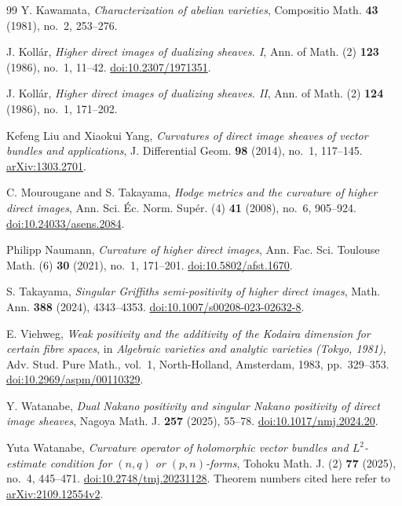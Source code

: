\documentclass[11pt,reqno]{amsart}
\numberwithin{equation}{section}
\theoremstyle{definition}
\theoremstyle{remark}
\begin{document}
\begin{thebibliography}{99}
Y. Kawamata, \emph{Characterization of abelian varieties}, Compositio Math. \textbf{43} (1981), no.~2, 253--276.

J. Koll\'ar, \emph{Higher direct images of dualizing sheaves. I}, Ann. of Math. (2) \textbf{123} (1986), no.~1, 11--42. \href{https://doi.org/10.2307/1971351}{doi:10.2307/1971351}.

J. Koll\'ar, \emph{Higher direct images of dualizing sheaves. II}, Ann. of Math. (2) \textbf{124} (1986), no.~1, 171--202.

Kefeng Liu and Xiaokui Yang, \emph{Curvatures of direct image sheaves of vector bundles and applications}, J. Differential Geom. \textbf{98} (2014), no.~1, 117--145. \href{https://arxiv.org/abs/1303.2701}{arXiv:1303.2701}.

C. Mourougane and S. Takayama, \emph{Hodge metrics and the curvature of higher direct images}, Ann. Sci. \'Ec. Norm. Sup\'er. (4) \textbf{41} (2008), no.~6, 905--924. \href{https://doi.org/10.24033/asens.2084}{doi:10.24033/asens.2084}.

Philipp Naumann, \emph{Curvature of higher direct images}, Ann. Fac. Sci. Toulouse Math. (6) \textbf{30} (2021), no.~1, 171--201. \href{https://doi.org/10.5802/afst.1670}{doi:10.5802/afst.1670}.

S. Takayama, \emph{Singular Griffiths semi-positivity of higher direct images}, Math. Ann. \textbf{388} (2024), 4343--4353. \href{https://doi.org/10.1007/s00208-023-02632-8}{doi:10.1007/s00208-023-02632-8}.

E. Viehweg, \emph{Weak positivity and the additivity of the Kodaira dimension for certain fibre spaces}, in \emph{Algebraic varieties and analytic varieties (Tokyo, 1981)}, Adv. Stud. Pure Math., vol.~1, North-Holland, Amsterdam, 1983, pp.~329--353. \href{https://doi.org/10.2969/aspm/00110329}{doi:10.2969/aspm/00110329}.

Y. Watanabe, \emph{Dual Nakano positivity and singular Nakano positivity of direct image sheaves}, Nagoya Math. J. \textbf{257} (2025), 55--78. \href{https://doi.org/10.1017/nmj.2024.20}{doi:10.1017/nmj.2024.20}.

Yuta Watanabe, \emph{Curvature operator of holomorphic vector bundles and $L^2$-estimate condition for $(n,q)$ or $(p,n)$-forms}, Tohoku Math. J. (2) \textbf{77} (2025), no.~4, 445--471. \href{https://doi.org/10.2748/tmj.20231128}{doi:10.2748/tmj.20231128}. Theorem numbers cited here refer to \href{https://arxiv.org/abs/2109.12554v2}{arXiv:2109.12554v2}.
\end{thebibliography}
\end{document}
